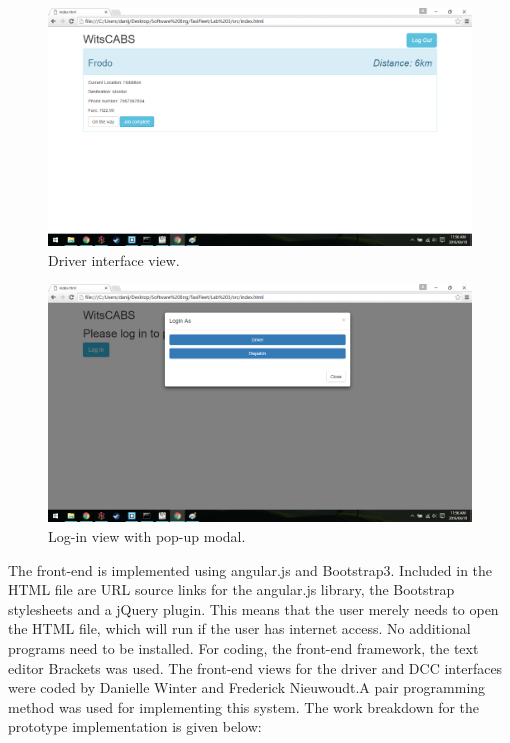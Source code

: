 \documentclass[12pt]{article}
\begin{document}
\begin{figure}[ht]
\centering
\includegraphics[width=1\textwidth]{driver view.png}
\caption{Driver interface view.}
\end{figure}

\begin{figure}[ht]
\centering
\includegraphics[width=1\textwidth]{login screen and pop up.png}
\caption{Log-in view with pop-up modal.}
\end{figure}


The front-end is implemented using angular.js and Bootstrap3. Included in the HTML file are URL source links for the angular.js library, the Bootstrap stylesheets and a jQuery plugin. This means that the user merely needs to open the HTML file, which will run if the user has internet access. No additional programs need to be installed. For coding, the front-end framework, the text editor Brackets was used. The front-end views for the driver and DCC interfaces were coded by Danielle Winter and Frederick Nieuwoudt.A pair programming method was used for implementing this system. The work breakdown for the prototype implementation is given below:
\end{document}
